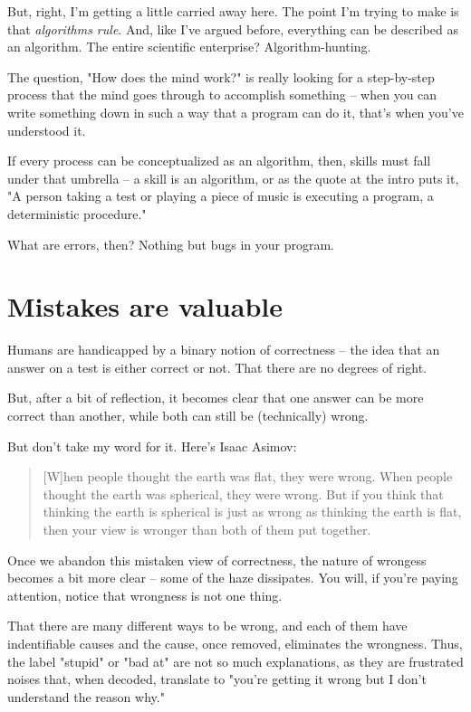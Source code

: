 But, right, I'm getting a little carried away here. The point I'm trying to make
is that \textit{algorithms rule}. And, like I've argued before, everything can be
described as an algorithm. The entire scientific enterprise? Algorithm-hunting.

The question, "How does the mind work?" is really looking for a step-by-step
process that the mind goes through to accomplish something -- when you can write
something down in such a way that a program can do it, that's when you've
understood it.

If every process can be conceptualized as an algorithm, then, skills must fall
under that umbrella -- a skill is an algorithm, or as the quote at the intro
puts it, "A person taking a test or playing a piece of music is executing a
program, a deterministic procedure."

What are errors, then? Nothing but bugs in your program.

\section{Mistakes are valuable}

Humans are handicapped by a binary notion of correctness -- the idea that an
answer on a test is either correct or not. That there are no degrees of right.

But, after a bit of reflection, it becomes clear that one answer can be more
correct than another, while both can still be (technically) wrong.

But don't take my word for it. Here's Isaac Asimov:

\begin{quote}
[W]hen people thought the earth was flat, they were wrong. When people thought
the earth was spherical, they were wrong. But if you think that thinking the
earth is spherical is just as wrong as thinking the earth is flat, then your
view is wronger than both of them put together.
\end{quote}
  
Once we abandon this mistaken view of correctness, the  nature of
wrongess becomes a bit more clear -- some of the haze dissipates. You will, if
you're paying attention, notice that wrongness is not one thing.

That there are many different ways to be wrong, and each of them have
indentifiable causes and the cause, once removed, eliminates the
wrongness. Thus, the label "stupid" or "bad at" are not so much explanations, as
they are frustrated noises that, when decoded, translate to "you're getting it
wrong but I don't understand the reason why."

